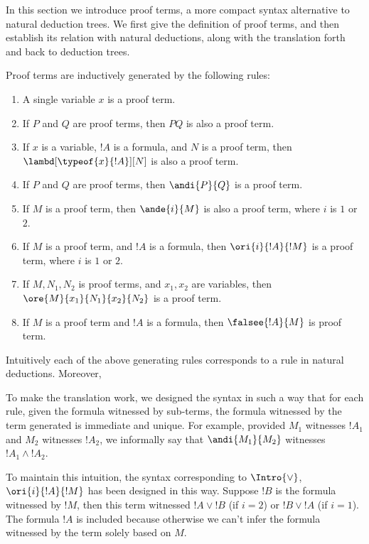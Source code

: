 \documentclass[../../../include/open-logic-section]{subfiles}
\begin{document}

In this section we introduce proof terms, a more compact syntax
alternative to natural deduction trees. We first give the definition
of proof terms, and then establish its relation with natural
deductions, along with the translation forth and back to deduction
trees.

\begin{defn}
  Proof terms are inductively generated by the following rules:
  \begin{enumerate}
  \item A single variable $x$ is a proof term.
  \item If $P$ and $Q$ are proof terms, then $PQ$ is also a proof
    term.
  \item If $x$ is a variable, $!A$ is a formula, and $N$ is a proof
    term, then $\lambd[\typeof{x}{!A}][N]$ is also a proof term.
  \item If $P$ and $Q$ are proof terms, then $\andi{P}{Q}$ is a proof
    term.
  \item If $M$ is a proof term, then $\ande{i}{M}$ is also a proof
    term, where $i$ is $1$ or $2$.
  \item If $M$ is a proof term, and $!A$ is a formula, then
    $\ori{i}{!A}{!M}$ is a proof term, where $i$ is $1$ or $2$.
  \item If $M, N_1, N_2$ is proof terms, and $x_1, x_2$ are variables,
    then $\ore{M}{x_1}{N_1}{x_2}{N_2}$ is a proof term.
  \item If $M$ is a proof term and $!A$ is a formula, then
    $\falsee{!A}{M}$ is proof term.
  \end{enumerate}
\end{defn}

Intuitively each of the above generating rules corresponds to a rule
in natural deductions. Moreover,

To make the translation work, we designed the syntax in such a way that
for each rule, given the formula witnessed by sub-terms, the formula
witnessed by the term generated is immediate and unique. For example,
provided $M_1$ witnesses $!A_1$ and $M_2$ witnesses $!A_2$, we
informally say that $\andi{M_1}{M_2}$ witnesses $!A_1 \land !A_2$.

To maintain this intuition, the syntax corresponding to
$\Intro{\lor}$, $\ori{i}{!A}{!M}$ has been designed in this way.
Suppose $!B$ is the formula witnessed by $!M$, then this term
witnessed $!A \lor !B$ (if $i=2$) or $!B \lor !A$ (if $i=1$). The
formula $!A$ is included because otherwise we can't infer the formula
witnessed by the term solely based on $M$.
\end{document}
